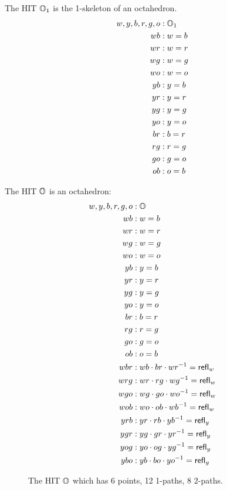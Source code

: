 \begin{mydef}
The HIT \( \mathbb{O}_1 \) is the 1-skeleton of an octahedron.
\begin{align*}
w, y, b, r, g, o &: \mathbb{O}_1 \\
wb &: w=b \\
wr &: w=r \\
wg &: w=g \\
wo &: w=o \\
yb &: y=b \\
yr &: y=r \\
yg &: y=g \\
yo &: y=o \\
br &: b=r \\
rg &: r=g \\
go &: g=o \\
ob &: o=b 
\end{align*}
\end{mydef}

\begin{mydef}
The HIT \( \mathbb{O} \) is an octahedron:
\begin{align*}
w, y, b, r, g, o &: \mathbb{O} \\
wb &: w=b \\
wr &: w=r \\
wg &: w=g \\
wo &: w=o \\
yb &: y=b \\
yr &: y=r \\
yg &: y=g \\
yo &: y=o \\
br &: b=r \\
rg &: r=g \\
go &: g=o \\
ob &: o=b \\
wbr &: wb\cdot br\cdot wr^{-1} = \mathsf{refl}_w \\
wrg &: wr\cdot rg\cdot wg^{-1} = \mathsf{refl}_w \\
wgo &: wg\cdot go\cdot wo^{-1} = \mathsf{refl}_w \\
wob &: wo\cdot ob\cdot wb^{-1} = \mathsf{refl}_w \\
yrb &: yr\cdot rb\cdot yb^{-1} = \mathsf{refl}_y \\
ygr &: yg\cdot gr\cdot yr^{-1} = \mathsf{refl}_y \\
yog &: yo\cdot og\cdot yg^{-1} = \mathsf{refl}_y \\
ybo &: yb\cdot bo\cdot yo^{-1} = \mathsf{refl}_y
\end{align*}
\end{mydef}

\begin{figure}[h]
\centering

\caption{The HIT \( \mathbb{O} \) which has 6 points, 12 1-paths, 8 2-paths.}
\end{figure}

